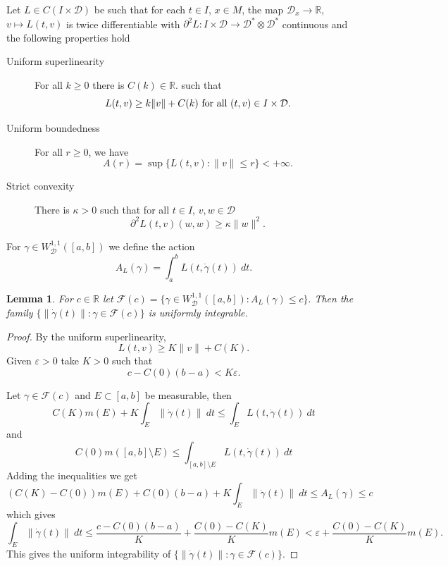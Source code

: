 \documentclass[12pt]{amsart}
\theoremstyle{plain}
\newtheorem{lemma}{Lemma}
\theoremstyle{definition}
\newcommand{\R}{\mathbb R}
\newcommand{\cD}{\mathcal D}
\newcommand{\cW}{W^{1,1}}
\newcommand{\cWD}{\cW_\cD}
\newcommand{\cF}{\mathcal F}
\newcommand{\ep}{\varepsilon}
\newcommand{\ga}{\gamma}
\newcommand{\ka}{\kappa}
\newcommand{\dga}{\dot\gamma}
\newcommand{\entre}{\setminus}
\begin{document}
Let $L\in C(I\times\cD)$ be such that for each
$t\in I$, $x\in M$, the map $\cD_x\to\R$, $v\mapsto L(t,v)$ is twice
differentiable with $\partial^2L:I\times\cD\to\cD^*\otimes\cD^*$ 
continuous and the following properties hold
\begin{description}
\item [Uniform superlinearity] For all $k\ge 0$ there is $C(k)\in\R$.
  such that \[L(t,v)\ge k\|v\|+C(k)\hbox{ for all }(t,v)\in I\times\cD.\]
\item [Uniform boundedness] For all $r\ge 0$, we have
  \[A(r)=\sup\{L(t,v):\|v\|\le r\}<+\infty.\]
\item [Strict convexity] There is  $\ka>0$ such that for all  $t\in I$, $v,w\in\cD$ 
 \[\partial^2L (t,v)(w,w)\ge\ka\|w\|^2.\]  
\end{description}
For $\ga\in\cWD([a,b])$ we define the action
\[A_L(\ga)=\int_a^bL(t,\dga(t))\ dt.\]
\begin{lemma}\label{UI}
  For $c\in\R$ let
  $\cF(c)=\{\ga\in\cWD([a,b]): A_L(\ga)\le c\}.$
  Then the family
  $\{\|\dga(t)\|:\ga\in\cF(c)\}$ is uniformly integrable.
\end{lemma}
\begin{proof}
 By the uniform superlinearity,
      \[L(t,v)\ge K\|v\|+C(K).\]
      Given $\ep>0$ take $K>0$ such that 
  $$c-C(0)(b-a)<K\ep.$$

  Let $\ga\in\cF(c)$ and $E\subset[a,b]$ be measurable, then  
\[C(K)m(E)+K\int_E\|\dga(t)\|\ dt
   \le\int_E L(t,\dga(t))\ dt\]
and
   \[C(0)m([a,b]\entre E)\le \int_{[a,b]\entre E} L(t,\dga(t))\ dt \]
  Adding the inequalities we get 
  \[(C(K)-C(0))m(E)+C(0)(b-a)+K\int_E
    \|\dga(t)\|\ dt    \le A_L(\ga)\le c\]
which gives
\[\int_E\|\dga(t)\|\ dt\le\frac{c-C(0)(b-a)}K+
  \frac{C(0)-C(K)}Km(E) <\ep+\frac{C(0)-C(K)}{K}m(E).\]
This gives the uniform integrability of $\{\|\dga(t)\|:\ga\in\cF(c)\}$.
\end{proof}
  
\end{document}
